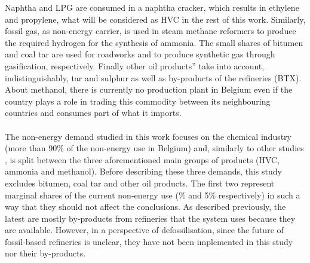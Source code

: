 Naphtha and \gls{LPG} are consumed in a naphtha cracker, which results in ethylene and propylene, what will be considered as \gls{HVC} in the rest of this work. Similarly, fossil gas, as non-energy carrier, is used in steam methane reformers to produce the required hydrogen for the synthesis of ammonia. The small shares of bitumen and coal tar are used for roadworks and to produce synthetic gas through gasification, respectively. Finally \og other oil products'' take into account, indistinguishably, tar and sulphur as well as by-products of the refineries (\eg \gls{BTX}). About methanol, there is currently no production plant in Belgium even if the country plays a role in trading this commodity between its neighbouring countries and consumes part of what it imports.\\

\\

\noindent
The non-energy demand studied in this work focuses on the chemical industry (more than 90\% of the non-energy use in Belgium) and, similarly to other studies \cite{IEA2018_petrochemicals, daioglou2014energy}, is split between the three aforementioned main groups of products (\ie \gls{HVC}, ammonia and methanol). Before describing these three demands, this study excludes bitumen, coal tar and \og other oil products\fg. The first two represent marginal shares of the current non-energy use (\% and 5\% respectively) in such a way that they should not affect the conclusions. As described previously, the latest are mostly by-products from refineries that the system uses because they are available. However, in a perspective of defossilisation, since the future of fossil-based refineries is unclear, they have not been implemented in this study nor their by-products.

